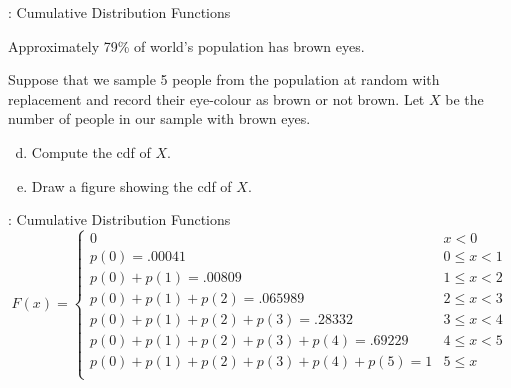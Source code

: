 \begin{frame}

  \begin{block}{\examplectd: Cumulative Distribution Functions}

    Approximately 79\% of world's population has brown eyes. 
    
    \bigskip
    
    Suppose that we sample 5 people from the population at random with replacement and record their eye-colour as brown or not brown. Let $X$ be the number of people in our sample with brown eyes.
    
    \bigskip

    \begin{enumerate}[a)]
    \setcounter{enumi}{3}
    \item Compute the cdf of $X$.
    \item Draw a figure showing the cdf of $X$. 
    \end{enumerate}
  \end{block}
\end{frame}

\begin{frame}

\begin{block}{\examplectd: Cumulative Distribution Functions}
$$
F(x)=\left\{
\begin{array}{ll}
0 & x < 0\\
p(0)=.00041 & 0 \leq x < 1\\
p(0) + p(1) = .00809 & 1 \leq x < 2\\
p(0) + p(1) + p(2) = .065989 & 2 \leq x < 3\\
p(0) + p(1) + p(2) + p(3) = .28332 & 3 \leq x <4\\
p(0) + p(1) + p(2) + p(3) + p(4)= .69229 &4 \leq x <5\\
p(0) + p(1) + p(2) + p(3) + p(4) + p(5)= 1 & 5 \leq x\\
\end{array}
\right.
$$
 \end{block}
\end{frame}


